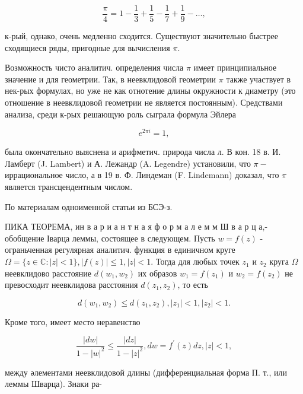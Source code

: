 \documentclass[10pt]{article}
\begin{document}
\[
\frac{\pi}{4}=1-\frac{1}{3}+\frac{1}{5}-\frac{1}{7}+\frac{1}{9}-\ldots,
\]

к-рый, однако, очень медленно сходится. Существуют значительно быстрее сходящиеся ряды, пригодные для вычисления $\pi$.

Возможность чисто аналитич. определения числа $\pi$ имеет принципиальное значение и для геометрии. Так, в неевклидовой геометрии $\pi$ также участвует в нек-рых формулах, но уже не как отнотение длины окружности к диаметру (это отношение в неевклидовой геометрии не является постоянным). Средствами анализа, среди к-рых решающую роль сыграла формула Эйлера

\[
e^{2 \pi i}=1,
\]

была окончательно выяснена и арифметич. природа числа л. В кон. 18 в. И. Ламберт (J. Lambert) и А. Лежандр (A. Legendre) установили, что $\pi-$ иррациональное число, а в 19 в. Ф. Линдеман (F. Lindemann) доказал, что $\pi$ является трансцендентным числом.

По материалам одноименной статьи из БСЭ-з.

ПИКА ТЕОРЕМА, ин в а р и а н т н а я ф о р м а л е м м Ш в а р ц а,- обобщение Іварца леммы, состоящее в следующем. Пусть $w=f(z)$ - ограньченная регулярная аналитич. функция в единичном круге $\Omega=\{z \in \mathbb{C}:|z|<1\},|f(z)| \leqslant 1,|z|<1$. Тогда для любых точек $z_{1}$ и $z_{2}$ круга $\Omega$ неевклидово расстояние $d\left(w_{1}, w_{2}\right)$ их образов $w_{1}=f\left(z_{1}\right)$ и $w_{2}=f\left(z_{2}\right)$ не превосходит неевклидова расстояния $d\left(z_{1}, z_{2}\right)$, то есть

\[
d\left(w_{1}, w_{2}\right) \leqslant d\left(z_{1}, z_{2}\right),\left|z_{1}\right|<1,\left|z_{2}\right|<1 .
\]

Кроме того, имеет место неравенство

\[
\frac{|d w|}{1-|w|^{2}} \leqslant \frac{|d z|}{1-|z|^{2}}, d w=f^{\prime}(z) d z,|z|<1,
\]

между әлементами неевклидовой длины (дифференциальная форма П. т., или леммы Шварца). Знаки ра-
\end{document}
